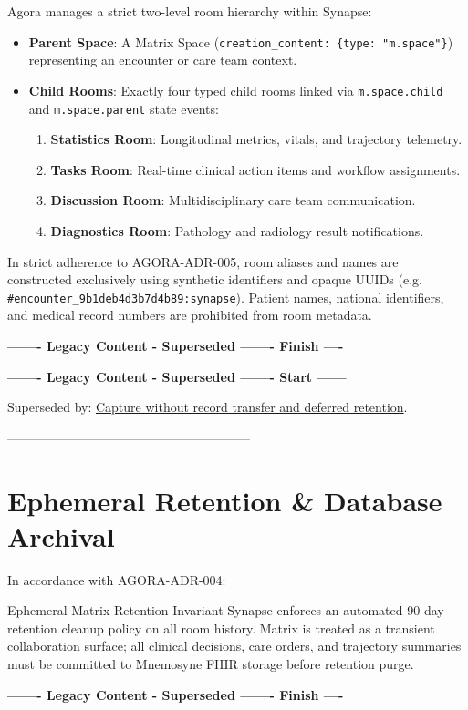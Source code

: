 Agora manages a strict two-level room hierarchy within Synapse:
\begin{itemize}
    \item \textbf{Parent Space}: A Matrix Space (\nolinkurl{creation_content: {type: "m.space"}}) representing an encounter or care team context.
    \item \textbf{Child Rooms}: Exactly four typed child rooms linked via \nolinkurl{m.space.child} and \nolinkurl{m.space.parent} state events:
    \begin{enumerate}
        \item \textbf{Statistics Room}: Longitudinal metrics, vitals, and trajectory telemetry.
        \item \textbf{Tasks Room}: Real-time clinical action items and workflow assignments.
        \item \textbf{Discussion Room}: Multidisciplinary care team communication.
        \item \textbf{Diagnostics Room}: Pathology and radiology result notifications.
    \end{enumerate}
\end{itemize}

In strict adherence to AGORA-ADR-005, room aliases and names are constructed exclusively using synthetic identifiers and opaque UUIDs (e.g. \nolinkurl{#encounter_9b1deb4d3b7d4b89:synapse}). Patient names, national identifiers, and medical record numbers are prohibited from room metadata.


\par\noindent\textbf{------- Legacy Content - Superseded ------- Finish ----}


\par\noindent\textbf{------- Legacy Content - Superseded ------- Start ------}
\par\noindent Superseded by: \href{../../markdown/05-information-systems-architecture/agora-omilia-collaboration.md\#managed-room-capture}{Capture without record transfer and deferred retention}.
\par\noindent ---------------------------------------------------------

\section{Ephemeral Retention \& Database Archival}

In accordance with AGORA-ADR-004:
\begin{principlebox}{Ephemeral Matrix Retention Invariant}
Synapse enforces an automated 90-day retention cleanup policy on all room history. Matrix is treated as a transient collaboration surface; all clinical decisions, care orders, and trajectory summaries must be committed to Mnemosyne FHIR storage before retention purge.
\end{principlebox}


\par\noindent\textbf{------- Legacy Content - Superseded ------- Finish ----}

\newpage
